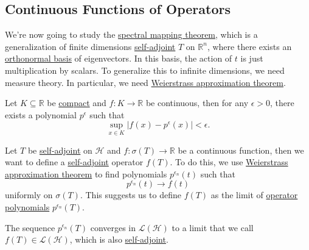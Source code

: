 \subsection{Continuous Functions of Operators}
We're now going to study the \hyperref[thm:spectral-mapping]{spectral mapping theorem}, which is a generalization of finite dimensions \hyperref[def:self-adjoint-op]{self-adjoint} \(T\) on \(\mathbb{R} ^n\), where there exists an \hyperref[def:orthonormal-basis]{orthonormal basis} of eigenvectors. In this basis, the action of \(t\) is just multiplication by scalars. To generalize this to infinite dimensions, we need measure theory. In particular, we need \hyperref[thm:Weierstrass-approximation]{Weierstrass approximation theorem}.

\begin{theorem}\label{thm:Weierstrass-approximation}
	Let \(K \subseteq \mathbb{R} \) be \hyperref[def:compact]{compact} and \(f\colon K \to \mathbb{R} \) be continuous, then for any \(\epsilon > 0\), there exists a polynomial \(p^{\epsilon } \) such that
	\[
		\sup_{x\in K} \vert f(x) - p^{\epsilon }(x)  \vert < \epsilon .
	\]
\end{theorem}

Let \(T\) be \hyperref[def:self-adjoint-op]{self-adjoint} on \(\mathcal{H} \) and \(f\colon \sigma (T) \to \mathbb{R} \) be a continuous function, then we want to define a \hyperref[def:self-adjoint-op]{self-adjoint} operator \(f(T)\). To do this, we use \hyperref[thm:Weierstrass-approximation]{Weierstrass approximation theorem} to find polynomials \(p^{\epsilon _n}(t)\) such that
\[
	p^{\epsilon _n}(t) \to f(t)
\]
uniformly on \(\sigma (T)\). This suggests us to define \(f(T)\) as the limit of \hyperref[def:polynomial-op]{operator polynomials} \(p^{\epsilon _n}(T)\).

\begin{definition}\label{def:continuous-function-op}
	The sequence \(p^{\epsilon _n}(T)\) converges in \(\mathcal{L} (\mathcal{H} )\) to a limit that we call \(f(T)\in \mathcal{L} (\mathcal{H} )\), which is also \hyperref[def:self-adjoint-op]{self-adjoint}.
\end{definition}

